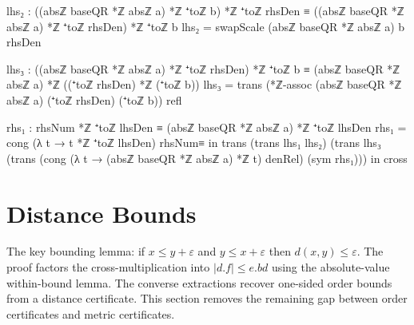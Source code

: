 \documentclass[11pt,a4paper]{book}
\def\cdot{.}%
\begin{document}
\begin{code}
        lhs₂ : ((absℤ baseQR *ℤ absℤ a) *ℤ ⁺toℤ b) *ℤ ⁺toℤ rhsDen ≡ ((absℤ baseQR *ℤ absℤ a) *ℤ ⁺toℤ rhsDen) *ℤ ⁺toℤ b
        lhs₂ = swapScale (absℤ baseQR *ℤ absℤ a) b rhsDen

        lhs₃ : ((absℤ baseQR *ℤ absℤ a) *ℤ ⁺toℤ rhsDen) *ℤ ⁺toℤ b ≡ (absℤ baseQR *ℤ absℤ a) *ℤ ((⁺toℤ rhsDen) *ℤ (⁺toℤ b))
        lhs₃ = trans (*ℤ-assoc (absℤ baseQR *ℤ absℤ a) (⁺toℤ rhsDen) (⁺toℤ b)) refl

        rhs₁ : rhsNum *ℤ ⁺toℤ lhsDen ≡ (absℤ baseQR *ℤ absℤ a) *ℤ ⁺toℤ lhsDen
        rhs₁ = cong (λ t → t *ℤ ⁺toℤ lhsDen) rhsNum≡
      in
      trans
        (trans lhs₁ lhs₂)
        (trans
          lhs₃
          (trans
            (cong (λ t → (absℤ baseQR *ℤ absℤ a) *ℤ t) denRel)
            (sym rhs₁)))
  in
  cross
\end{code}

\section{Distance Bounds}

The key bounding lemma: if $x \le y + \varepsilon$ and $y \le x + \varepsilon$
then $d(x,y) \le \varepsilon$. The proof factors the cross-multiplication
into $|d \cdot f| \le e \cdot bd$ using the absolute-value within-bound
lemma. The converse extractions recover one-sided order bounds from
a distance certificate.  This section removes the remaining gap between order
certificates and metric certificates.
\end{document}
